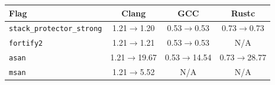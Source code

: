 \begin{tabular*}{\columnwidth}{@{\extracolsep\fill}lccc@{\extracolsep\fill}}
\toprule
\textbf{Flag} & \textbf{Clang} & \textbf{GCC} & \textbf{Rustc} \\
\midrule
\texttt{stack\_protector\_strong} & 1.21$\to$1.20 & 0.53$\to$0.53 & 0.73$\to$0.73 \\
\texttt{fortify2} & 1.21$\to$1.21 & 0.53$\to$0.53 & N/A \\
\texttt{asan} & 1.21$\to$19.67 & 0.53$\to$14.54 & 0.73$\to$28.77 \\
\texttt{msan} & 1.21$\to$5.52 & N/A & N/A \\
\bottomrule
\end{tabular*}
